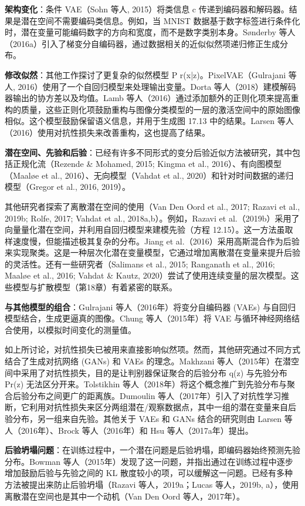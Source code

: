 \documentclass[lang=cn,newtx,10pt,scheme=chinese]{elegantbook}
\begin{document}
\textbf{架构变化}：条件 VAE（Sohn 等人, 2015）将类信息 c 传递到编码器和解码器。结果是潜在空间不需要编码类信息。例如，当 MNIST 数据基于数字标签进行条件化时，潜在变量可能编码数字的方向和宽度，而不是数字类别本身。Sønderby 等人（2016a）引入了梯变分自编码器，通过数据相关的近似似然项递归修正生成分布。

\textbf{修改似然}：其他工作探讨了更复杂的似然模型 P r(x|z)。PixelVAE（Gulrajani 等人, 2016）使用了一个自回归模型来处理输出变量。Dorta 等人（2018）建模解码器输出的协方差以及均值。Lamb 等人（2016）通过添加额外的正则化项来提高重构的质量，这些正则化项鼓励重构与图像分类模型的一层的激活空间中的原始图像相似。这个模型鼓励保留语义信息，并用于生成图 17.13 中的结果。Larsen 等人（2016）使用对抗性损失来改善重构，这也提高了结果。

\textbf{潜在空间、先验和后验}：已经有许多不同形式的变分后验近似方法被研究，其中包括正规化流（Rezende \& Mohamed, 2015; Kingma et al., 2016）、有向图模型（Maaløe et al., 2016）、无向模型（Vahdat et al., 2020）和针对时间数据的递归模型（Gregor et al., 2016, 2019）。

其他研究者探索了离散潜在空间的使用（Van Den Oord et al., 2017; Razavi et al., 2019b; Rolfe, 2017; Vahdat et al., 2018a,b）。例如，Razavi et al.（2019b）采用了向量量化潜在空间，并利用自回归模型来建模先验（方程 12.15）。这一方法虽取样速度慢，但能描述极其复杂的分布。Jiang et al.（2016）采用高斯混合作为后验来实现聚类。这是一种层次化潜在变量模型，它通过增加离散潜在变量来提升后验的灵活性。还有一些研究者（Salimans et al., 2015; Ranganath et al., 2016; Maaløe et al., 2016; Vahdat \& Kautz, 2020）尝试了使用连续变量的层次模型。这些模型与扩散模型（第18章）有着紧密的联系。


\textbf{与其他模型的组合}：Gulrajani 等人（2016年）将变分自编码器 (VAEs) 与自回归模型结合，生成更逼真的图像。Chung 等人（2015年）将 VAE 与循环神经网络结合使用，以模拟时间变化的测量值。

如上所讨论，对抗性损失已被用来直接影响似然项。然而，其他研究通过不同方式结合了生成对抗网络 (GANs) 和 VAEs 的理念。Makhzani 等人（2015年）在潜空间中采用了对抗性损失，目的是让判别器保证聚合的后验分布 q(z) 与先验分布 Pr(z) 无法区分开来。Tolstikhin 等人（2018年）将这个概念推广到先验分布与聚合后验分布之间更广的距离族。Dumoulin 等人（2017年）引入了对抗性学习推断，它利用对抗性损失来区分两组潜在/观察数据点，其中一组的潜在变量来自后验分布，另一组来自先验。其他关于 VAEs 和 GANs 结合的研究则由 Larsen 等人（2016年）、Brock 等人（2016年）和 Hsu 等人（2017a年）提出。

\textbf{后验坍塌问题}：在训练过程中，一个潜在问题是后验坍塌，即编码器始终预测先验分布。Bowman 等人（2015年）发现了这一问题，并指出通过在训练过程中逐步增加鼓励后验与先验之间的 KL 散度较小的项，可以缓解这一问题。已经有多种方法被提出来防止后验坍塌（Razavi 等人，2019a；Lucas 等人，2019b, a），使用离散潜在空间也是其中一个动机（Van Den Oord 等人，2017年）。
\end{document}
